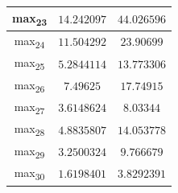 \documentclass[12pt]{article}
\begin{document}
\begin{table}
\begin{tabular}{||c c c||}
			max\textsubscript{23} & $14.242097$ & $44.026596$ \\
			\hline
			max\textsubscript{24} & $11.504292$ & $23.90699$ \\
			\hline
			max\textsubscript{25} & $5.2844114$ & $13.773306$ \\
			\hline
			max\textsubscript{26} & $7.49625$ & $17.74915$ \\
			\hline
			max\textsubscript{27} & $3.6148624$ & $8.03344$ \\
			\hline
			max\textsubscript{28} & $4.8835807$ & $14.053778$ \\
			\hline
			max\textsubscript{29} & $3.2500324$ & $9.766679$ \\
			\hline
			max\textsubscript{30} & $1.6198401$ & $3.8292391$ \\
			\hline
		\end{tabular}
	\label{Tab:Features_3_3}
\end{table}
\end{document}

